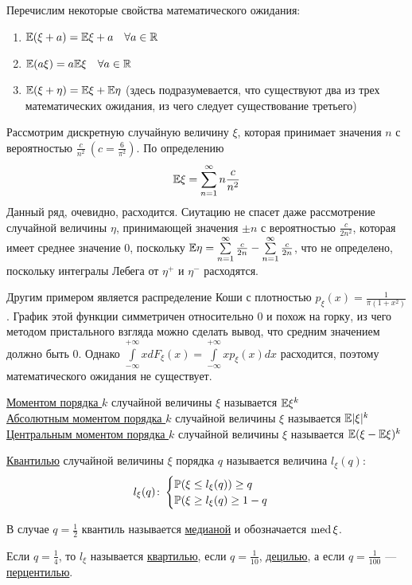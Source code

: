\documentclass[../TV&MS.tex]{subfiles}
\begin{document}
Перечислим некоторые свойства математического ожидания:
\begin{enumerate}
	\item $\mathbb{E}(\xi + a) = \mathbb{E}\xi + a \quad \forall a \in \mathbb{R}$
	\item $\mathbb{E}(a\xi) = a\mathbb{E}\xi \quad \forall a \in \mathbb{R}$
	\item $\mathbb{E}(\xi + \eta) = \mathbb{E}\xi + \mathbb{E}\eta$ (здесь подразумевается, что существуют два из трех математических ожидания, из чего следует существование третьего)
\end{enumerate}
\begin{Ex}
Рассмотрим дискретную случайную величину $\xi$, которая принимает значения $n$ с вероятностью $\frac{c}{n^2} \ (c = \frac{6}{\pi^2})$. По определению
$$ \mathbb{E}\xi = \sum\limits_{n=1}^{\infty} n \frac{c}{n^2} $$
Данный ряд, очевидно, расходится. Сиутацию не спасет даже рассмотрение случайной величины $\eta$, принимающей значения $\pm n$ с вероятностью $\frac{c}{2n^2}$, 
которая имеет среднее значение 0, 
поскольку $\mathbb{E}\eta = \sum\limits_{n=1}^{\infty} \frac{c}{2n} - \sum\limits_{n=1}^{\infty} \frac{c}{2n}$, что не определено, поскольку интегралы Лебега от $\eta^+$ и $\eta^-$ расходятся.\\
\end{Ex}
\begin{Ex}
Другим примером является распределение Коши с плотностью $p_\xi(x) = \frac{1}{\pi(1+x^2)}$. График этой функции симметричен относительно 0 и похож на горку, из чего
методом пристального взгляда можно сделать вывод, что средним значением должно быть 0. Однако  $
\int\limits_{-\infty}^{+\infty} x dF_\xi(x) =  \int\limits_{-\infty}^{+\infty} x p_\xi(x)dx$ расходится, поэтому математического ожидания не существует.
\end{Ex}

\begin{Def}
\underline{Моментом порядка $k$} случайной величины $\xi$ называется $\mathbb{E}\xi^k$ \\
\underline{Абсолютным моментом порядка $k$} случайной величины $\xi$ называется $\mathbb{E}|\xi|^k$ \\
\underline{Центральным моментом порядка $k$} случайной величины $\xi$ называется $\mathbb{E}(\xi - \mathbb{E}\xi)^k$ \\
\end{Def}

\begin{Def}
\underline{Квантилью} случайной величины $\xi$ порядка $q$ называется величина $l_\xi(q)$:
\[
   	l_\xi(q) \colon 
  	\begin{cases}
  		\mathbb{P}(\xi \le l_\xi(q)) \ge q \\
  		\mathbb{P}(\xi \ge l_\xi(q) \ge 1-q
  	\end{cases}
  \]
  
  В случае $q=\frac12$ квантиль называется \underline{медианой} и обозначается ${\rm med \,}\xi$.
  
  Если $q=\frac14$, то $l_\xi$ называется \underline{квартилью}, если $q=\frac1{10}$, \underline{децилью}, а если $q=\frac{1}{100}$ --- \underline{перцентилью}.
\end{Def}
\end{document}
